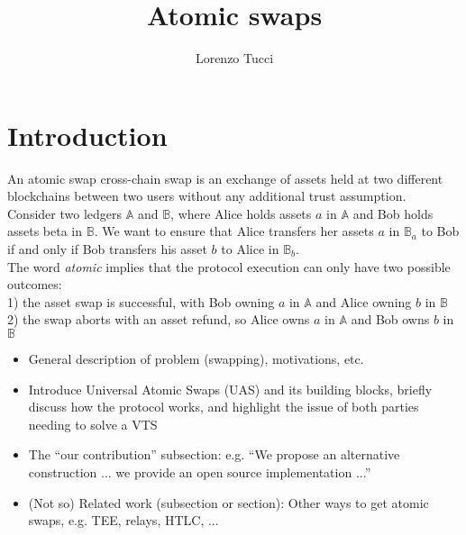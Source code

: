 \documentclass{article}      	%
\begin{document}
         
\author{Lorenzo Tucci}
\title{Atomic swaps}

\maketitle

\tableofcontents
\section{Introduction}

An atomic swap cross-chain swap is an exchange of assets held at two different blockchains between two users without any additional trust assumption. \\
Consider two ledgers $\mathbb{A}$ and $\mathbb{B}$, where Alice holds assets $a$ in $\mathbb{A}$ and Bob holds assets beta in $\mathbb{B}$. We want to ensure that Alice transfers her assets $a$ in $\mathbb{B}_a$ to Bob if and only if Bob transfers his asset $b$ to Alice in $\mathbb{B}_b$. \\

The word \textit{atomic} implies that the protocol execution can only have two possible outcomes: \\
1) the asset swap is successful, with Bob owning $a$ in $\mathbb{A}$ and Alice owning $b$ in $\mathbb{B}$ \\
2) the swap aborts with an asset refund, so Alice owns $a$ in $\mathbb{A}$ and Bob owns $b$ in $\mathbb{B}$ \\


\begin{itemize}
\item General description of problem (swapping), motivations, etc.
\item Introduce Universal Atomic Swaps (UAS) and its building blocks, briefly discuss how the protocol works, and highlight the issue of both parties needing to solve a VTS
\item The ``our contribution'' subsection: e.g. ``We propose an alternative construction ... we provide an open source implementation ...''
\item (Not so) Related work (subsection or section): Other ways to get atomic swaps, e.g. TEE, relays, HTLC, ...
\end{itemize}

\end{document}
